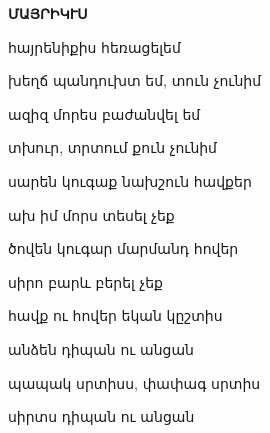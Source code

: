               


                {\bf  ՄԱՅՐԻԿՒՍ}


                    հայրենիքիս   հեռացելեմ 
                    
                    խեղճ պանդուխտ եմ,  տուն չունիմ

                    ազիզ մորես բաժանվել  եմ

                  տխուր, տրտում  քուն չունիմ


                  


                  սարեն կուգաք նախշուն հավքեր


                  ախ իմ  մորս տեսել չեք


                  ծովեն  կուգար մարմանդ հովեր


                  սիրո բարև բերել չեք





                  հավք ու հովեր եկան կըշտիս

                անձեն դիպան  ու անցան  


                պապակ սրտիսս, փափագ սրտիս

                սիրտս դիպան ու անցան




